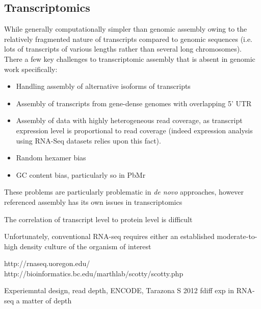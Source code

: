 \subsection{Transcriptomics}


While generally computationally simpler than genomic assembly \citep{MacManes2014}
owing to the relatively fragmented nature of transcripts compared to genomic 
sequences (i.e. lots of transcripts of various lengths rather than several 
long chromosomes).  There a few key challenges to transcriptomic assembly
that is absent in genomic work specifically:
\begin{itemize}
    \item Handling assembly of alternative isoforms of transcripts \citep{Pyrkosz2013}
    \item Assembly of transcripts from gene-dense genomes with overlapping 5' UTR 
    \item Assembly of data with highly heterogeneous read coverage, as transcript
        expression level is proportional to read coverage (indeed expression analysis
        using RNA-Seq datasets relies upon this fact).
    \item Random hexamer bias
    \item GC content bias, particularly so in PbMr
\end{itemize}

These problems are particularly problematic in \textit{de novo} approaches,
however referenced assembly has its own issues in transcriptomics






The correlation of transcript level to protein level is difficult





Unfortunately, conventional RNA-seq requires either an established moderate-to-high
density culture of the organism of interest 








http://rnaseq.uoregon.edu/
http://bioinformatics.bc.edu/marthlab/scotty/scotty.php

Experiemntal design, read depth, ENCODE, Tarazona S 2012 fdiff exp in RNA-seq
a matter of depth

